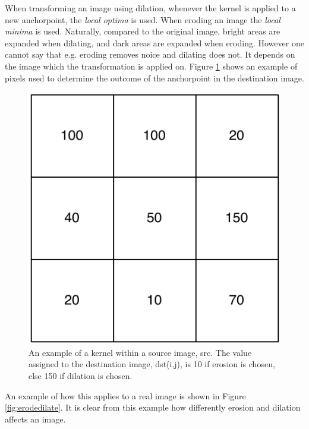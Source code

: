 When transforming an image using dilation, whenever the kernel is applied to a new anchorpoint, the \textit{local optima} is used. When eroding an image the \textit{local minima} is used. Naturally, compared to the original image, bright areas are expanded when dilating, and dark areas are expanded when eroding. However one cannot say that e.g. eroding removes noice and dilating does not. It depends on the image which the transformation is applied on. Figure \ref{fig:sample_kernel} shows an example of pixels used to determine the outcome of the anchorpoint in the destination image. \\

\begin{figure}[ht!]
  \centering
    \includegraphics[scale=0.50]{img/sample_kernel.pdf}
  \caption{An example of a kernel within a source image, src. The value assigned to the destination image, dst(i,j), is 10 if erosion is chosen, else 150 if dilation is chosen.}
  \label{fig:sample_kernel}
\end{figure}

An example of how this applies to a real image is shown in Figure \ref{fig:erodedilate}. It is clear from this example how differently erosion and dilation affects an image.\\

